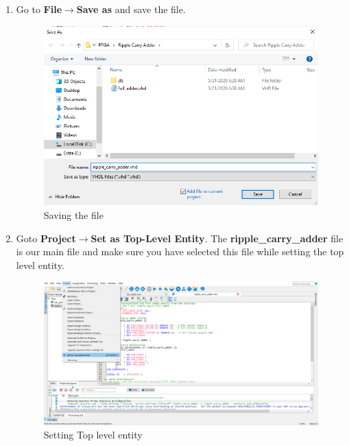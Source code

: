 \documentclass[12pt,singleside,a4paper]{article}
\begin{document}
\begin{enumerate}
     \item Go to \textbf{File}$\rightarrow$\textbf{Save as} and save the file.
    \begin{figure}[H]
        \centering
    \includegraphics[width=14cm,keepaspectratio]{img5.png}
    \caption{Saving the file}
    \end{figure}
    \newpage
    \item Goto \textbf{Project}$\rightarrow$\textbf{Set as Top-Level Entity}. The \textbf{ripple\_carry\_adder} file is our main file and make sure you have selected this file while setting the top level entity.
    \begin{figure}[H]
        \centering
    \includegraphics[width=14cm,keepaspectratio]{img6.png}
    \caption{Setting Top level entity}
    \end{figure}
    

\end{enumerate}
\end{document}
